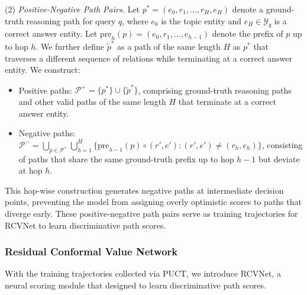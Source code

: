 \documentclass{article}
\theoremstyle{plain}
\theoremstyle{definition}
\theoremstyle{remark}
\begin{document}
(2) \textit{Positive-Negative Path Pairs.} 
Let $p^* = (e_0, r_1, \ldots, r_H, e_H)$ denote a ground-truth reasoning 
path for query $q$, where $e_0$ is the topic entity and $e_H \in \mathcal{Y}_q$ is a correct answer entity. 
Let $\text{pre}_{h}(p) = (e_0, r_1, \ldots, e_{h-1})$ 
denote the prefix of $p$ up to hop $h$. 
We further define $\tilde{p}^*$ as a path of the same length $H$ as $p^*$ that traverses a different sequence of relations while terminating at a correct answer entity. 
We construct:
\begin{itemize}[leftmargin=*,itemsep=1pt,topsep=2pt]
    \item Positive paths: $\mathcal{P}^+ = \{p^*\} \cup \{\tilde{p}^*\}$, comprising ground-truth reasoning paths and other valid paths of the same length $H$ that terminate at a correct answer entity.
    
    \item Negative paths: $\mathcal{P}^- = \bigcup_{p \in \mathcal{P}^+} \bigcup_{h=1}^{H} \{\text{pre}_{h-1}(p) \circ (r', e') : (r', e') \neq (r_h, e_h)\}$, 
    consisting of paths that share the same ground-truth prefix up to hop $h-1$ but deviate at hop $h$.
\end{itemize}
This hop-wise construction generates negative paths at intermediate decision points, preventing the model from assigning overly optimistic scores to paths that diverge early. 
These positive-negative path pairs serve as training trajectories for RCVNet to learn discriminative path scores.

\subsubsection{Residual Conformal Value Network}
\label{sec:rcvnet_arch}

With the training trajectories collected via PUCT, we introduce RCVNet, a neural scoring module that designed to learn discriminative path scores.
\end{document}
